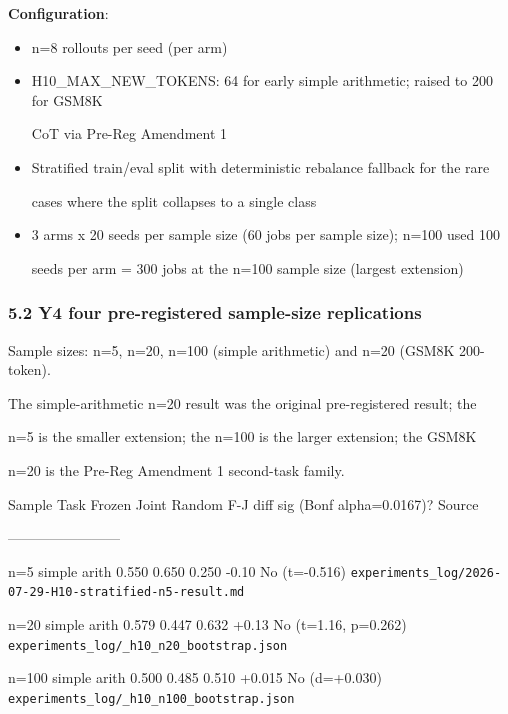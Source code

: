 \documentclass[
]{article}
\begin{document}
\textbf{Configuration}:

\begin{itemize}
\item
  n=8 rollouts per seed (per arm)
\item
  H10\_MAX\_NEW\_TOKENS: 64 for early simple arithmetic; raised to 200
  for GSM8K

  CoT via Pre-Reg Amendment 1
\item
  Stratified train/eval split with deterministic rebalance fallback for
  the rare

  cases where the split collapses to a single class
\item
  3 arms x 20 seeds per sample size (60 jobs per sample size); n=100
  used 100

  seeds per arm = 300 jobs at the n=100 sample size (largest extension)
\end{itemize}

\subsubsection{5.2 Y4 four pre-registered sample-size
replications}\label{y4-four-pre-registered-sample-size-replications}

Sample sizes: n=5, n=20, n=100 (simple arithmetic) and n=20 (GSM8K
200-token).

The simple-arithmetic n=20 result was the original pre-registered
result; the

n=5 is the smaller extension; the n=100 is the larger extension; the
GSM8K

n=20 is the Pre-Reg Amendment 1 second-task family.

Sample \textbar{} Task \textbar{} Frozen \textbar{} Joint \textbar{}
Random \textbar{} F-J diff \textbar{} sig (Bonf alpha=0.0167)?
\textbar{} Source \textbar{}

\textbar---\textbar---\textbar---\textbar---\textbar---\textbar---\textbar---\textbar---\textbar{}

n=5 \textbar{} simple arith \textbar{} 0.550 \textbar{} 0.650 \textbar{}
0.250 \textbar{} -0.10 \textbar{} No (t=-0.516) \textbar{}
\texttt{experiments\_log/2026-07-29-H10-stratified-n5-result.md}
\textbar{}

n=20 \textbar{} simple arith \textbar{} 0.579 \textbar{} 0.447
\textbar{} 0.632 \textbar{} +0.13 \textbar{} No (t=1.16, p=0.262)
\textbar{} \texttt{experiments\_log/\_h10\_n20\_bootstrap.json}
\textbar{}

n=100 \textbar{} simple arith \textbar{} 0.500 \textbar{} 0.485
\textbar{} 0.510 \textbar{} +0.015 \textbar{} No (d=+0.030) \textbar{}
\texttt{experiments\_log/\_h10\_n100\_bootstrap.json} \textbar{}
\end{document}

